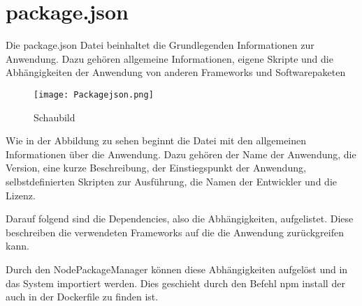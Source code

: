 
\chapter{package.json}
\label{ch:package.json}

Die package.json Datei beinhaltet die Grundlegenden Informationen zur Anwendung. Dazu gehören allgemeine Informationen, eigene Skripte und die Abhängigkeiten der Anwendung von anderen Frameworks und Softwarepaketen

\begin{wrapfigure}{r}{0\textwidth}
\centering
\texttt{[image: Packagejson.png]}
\vspace{4pt}
\caption{Schaubild\footnotemark}
\label{fig:blueant}
\end{wrapfigure}

Wie in der Abbildung zu sehen beginnt die Datei mit den allgemeinen Informationen über die Anwendung. Dazu gehören der Name der Anwendung, die Version, eine kurze Beschreibung, der Einstiegspunkt der Anwendung, selbstdefinierten Skripten zur Ausführung, die Namen der Entwickler und die Lizenz.

Darauf folgend sind die Dependencies, also die Abhängigkeiten, aufgelistet. Diese beschreiben die verwendeten Frameworks auf die die Anwendung zurückgreifen kann.

Durch den NodePackageManager können diese Abhängigkeiten aufgelöst und in das System importiert werden. Dies geschieht durch den Befehl npm install der auch in der Dockerfile zu finden ist.